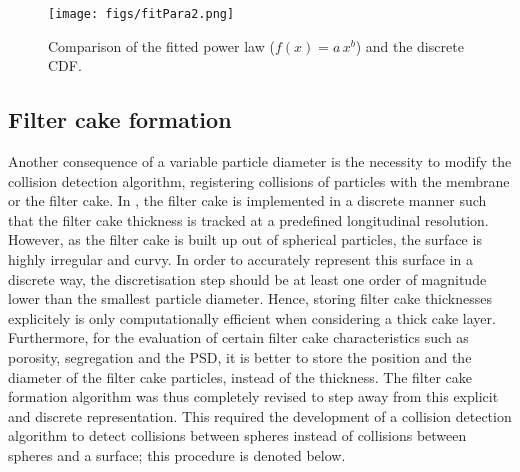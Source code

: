 \begin{figure}[H]
 \begin{center}
   \texttt{[image: figs/fitPara2.png]}
 \caption{Comparison of the fitted power law ($f(x)= a\, x^{b}$) and the discrete CDF. \label{fig:veloFit}}
 \end{center}
 \end{figure}
\subsection{Filter cake formation \label{sec:FCForm}}
Another consequence of a variable particle diameter is the necessity to modify the collision detection algorithm, registering collisions of particles with the membrane or the filter cake. In \cite{Ghijs2014}, the filter cake is implemented in a discrete manner such that the filter cake thickness is tracked at a predefined longitudinal resolution. However, as the filter cake is built up out of spherical particles, the surface is highly irregular and curvy. In order to accurately represent this surface in a discrete way, the discretisation step should be at least one order of magnitude lower than the smallest particle diameter. Hence, storing filter cake thicknesses explicitely is only computationally efficient when considering a thick cake layer. Furthermore, for the evaluation of certain filter cake characteristics such as porosity, segregation and the \gls{PSD}, it is better to store the position and the diameter of the filter cake particles, instead of the thickness. The filter cake formation algorithm was thus completely revised to step away from this explicit and discrete representation. This required the development of a collision detection algorithm to detect collisions between spheres instead of collisions between spheres and a surface; this procedure is denoted below.\\ \\
